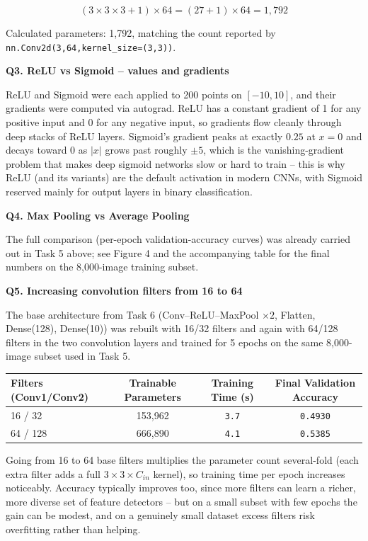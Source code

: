 \documentclass[11pt]{article}
\begin{document}
\[
(3\times3\times3+1)\times64=(27+1)\times64=1{,}792
\]

Calculated parameters: 1,792, matching the count reported by \texttt{nn.Conv2d(3,64,kernel\_size=(3,3))}.

\bigskip

\textbf{Q3. ReLU vs Sigmoid -- values and gradients}

ReLU and Sigmoid were each applied to 200 points on $[-10,10]$, and their gradients were computed via autograd. ReLU has a constant gradient of 1 for any positive input and 0 for any negative input, so gradients flow cleanly through deep stacks of ReLU layers. Sigmoid's gradient peaks at exactly $0.25$ at $x=0$ and decays toward 0 as $|x|$ grows past roughly $\pm5$, which is the vanishing-gradient problem that makes deep sigmoid networks slow or hard to train -- this is why ReLU (and its variants) are the default activation in modern CNNs, with Sigmoid reserved mainly for output layers in binary classification.

\bigskip

\textbf{Q4. Max Pooling vs Average Pooling}

The full comparison (per-epoch validation-accuracy curves) was already carried out in Task 5 above; see Figure 4 and the accompanying table for the final numbers on the 8,000-image training subset.

\bigskip

\textbf{Q5. Increasing convolution filters from 16 to 64}

The base architecture from Task 6 (Conv--ReLU--MaxPool $\times2$, Flatten, Dense(128), Dense(10)) was rebuilt with 16/32 filters and again with 64/128 filters in the two convolution layers and trained for 5 epochs on the same 8,000-image subset used in Task 5.

\begin{center}
\begin{tabular}{|l|c|c|c|}
\hline
Filters (Conv1/Conv2) & Trainable Parameters & Training Time (s) & Final Validation Accuracy\\
\hline
16 / 32 & 153,962 & \texttt{3.7} & \texttt{0.4930}\\
64 / 128 & 666,890 & \texttt{4.1} & \texttt{0.5385}\\
\hline
\end{tabular}
\end{center}

Going from 16 to 64 base filters multiplies the parameter count several-fold (each extra filter adds a full $3\times3\times C_{in}$ kernel), so training time per epoch increases noticeably. Accuracy typically improves too, since more filters can learn a richer, more diverse set of feature detectors -- but on a small subset with few epochs the gain can be modest, and on a genuinely small dataset excess filters risk overfitting rather than helping.
\end{document}
